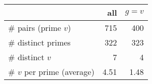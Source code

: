 \begin{table}[ht]
    \centering
    \begin{tabular}{lrr}
        \toprule
                                  & all  &  $g = v$  \\ \midrule
        \# pairs (prime $v$)      & 715  & 400       \\ 
        \# distinct primes        & 322  & 323       \\ 
        \# distinct $v$           & 7    & 4         \\
        \# $v$ per prime (average) & 4.51 & 1.48      \\ \bottomrule
    \end{tabular}
    \label{tab:experiments}
\end{table}